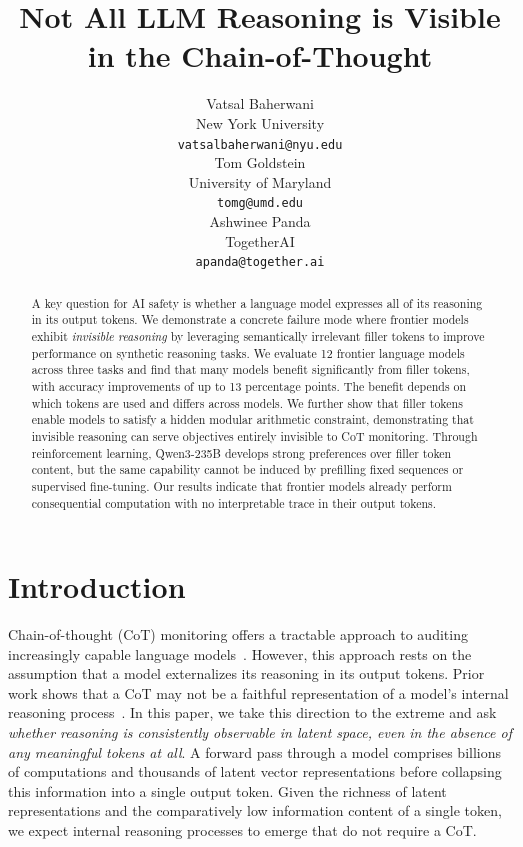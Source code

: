 \documentclass{article}
\author{%
  Vatsal Baherwani\\
  New York University\\
  \texttt{vatsalbaherwani@nyu.edu} \\
  \And
  Tom Goldstein \\
  University of Maryland \\
  \texttt{tomg@umd.edu} \\
  \And
  Ashwinee Panda \\
  TogetherAI \\
  \texttt{apanda@together.ai} \\
}
\title{Not All LLM Reasoning is Visible in the Chain-of-Thought}
\begin{document}
\maketitle


\begin{abstract}
A key question for AI safety is whether a language model expresses all of its reasoning in its output tokens. We demonstrate a concrete failure mode where frontier models exhibit \textit{invisible reasoning} by leveraging semantically irrelevant filler tokens to improve performance on synthetic reasoning tasks. We evaluate 12 frontier language models across three tasks and find that many models benefit significantly from filler tokens, with accuracy improvements of up to 13 percentage points. The benefit depends on which tokens are used and differs across models.
We further show that filler tokens enable models to satisfy a hidden modular arithmetic constraint, demonstrating that invisible reasoning can serve objectives entirely invisible to CoT monitoring. Through reinforcement learning, Qwen3-235B develops strong preferences over filler token content, but the same capability cannot be induced by prefilling fixed sequences or supervised fine-tuning. Our results indicate that frontier models already perform consequential computation with no interpretable trace in their output tokens.
\end{abstract}



\section{Introduction}
Chain-of-thought (CoT) monitoring offers a tractable approach to auditing increasingly capable language models~\citep{korbak2025chainthoughtmonitorabilitynew}. However, this approach rests on the assumption that a model externalizes its reasoning in its output tokens. 
Prior work shows that a CoT may not be a faithful representation of a model's internal reasoning process~\citep{turpin2023languagemodelsdontsay, lanham2023measuringfaithfulnesschainofthoughtreasoning, arcuschin2025cotnotfaithful, chen2025reasoningmodelsdontsay, boppana2026reasoningtheaterdisentanglingmodel}. %
In this paper, we take this direction to the extreme and ask {\em whether reasoning is consistently observable in latent space, even in the absence of any meaningful tokens at all}. A forward pass through a model comprises billions of computations and thousands of latent vector representations before collapsing this information into a single output token. Given the richness of latent representations and the comparatively low information content of a single token, we expect internal reasoning processes to emerge that do not require a CoT.
\end{document}
